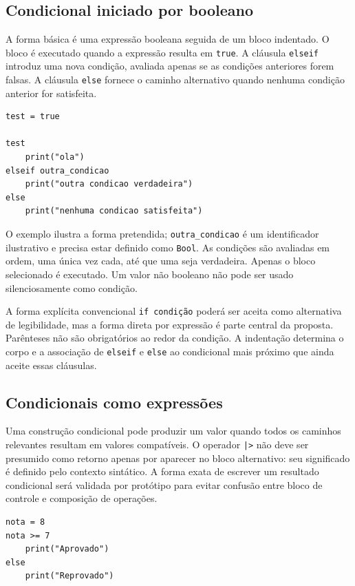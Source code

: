 \documentclass[12pt,a4paper]{article}
\begin{document}
\subsection{Condicional iniciado por booleano}
A forma básica é uma expressão booleana seguida de um bloco indentado. O bloco é executado quando a expressão resulta em \texttt{true}. A cláusula \texttt{elseif} introduz uma nova condição, avaliada apenas se as condições anteriores forem falsas. A cláusula \texttt{else} fornece o caminho alternativo quando nenhuma condição anterior for satisfeita.

\begin{lstlisting}
test = true

test
    print("ola")
elseif outra_condicao
    print("outra condicao verdadeira")
else
    print("nenhuma condicao satisfeita")
\end{lstlisting}

O exemplo ilustra a forma pretendida; \texttt{outra\_condicao} é um identificador ilustrativo e precisa estar definido como \texttt{Bool}. As condições são avaliadas em ordem, uma única vez cada, até que uma seja verdadeira. Apenas o bloco selecionado é executado. Um valor não booleano não pode ser usado silenciosamente como condição.

A forma explícita convencional \texttt{if condição} poderá ser aceita como alternativa de legibilidade, mas a forma direta por expressão é parte central da proposta. Parênteses não são obrigatórios ao redor da condição. A indentação determina o corpo e a associação de \texttt{elseif} e \texttt{else} ao condicional mais próximo que ainda aceite essas cláusulas.

\subsection{Condicionais como expressões}
Uma construção condicional pode produzir um valor quando todos os caminhos relevantes resultam em valores compatíveis. O operador \texttt{|>} não deve ser presumido como retorno apenas por aparecer no bloco alternativo: seu significado é definido pelo contexto sintático. A forma exata de escrever um resultado condicional será validada por protótipo para evitar confusão entre bloco de controle e composição de operações.

\begin{lstlisting}
nota = 8
nota >= 7
    print("Aprovado")
else
    print("Reprovado")
\end{lstlisting}
\end{document}
